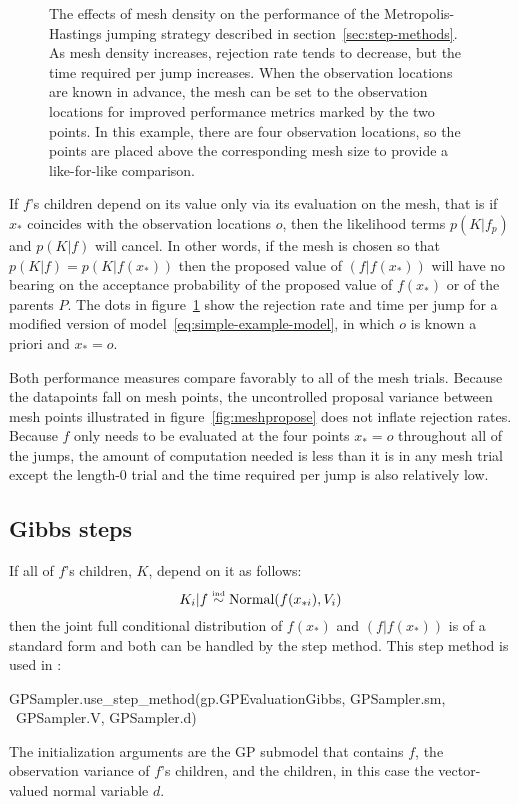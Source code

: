 \documentclass[article]{jss}
\begin{document}
\begin{figure}
    \centering
    \caption{The effects of mesh density on the performance of the Metropolis-Hastings jumping strategy described in section~\ref{sec:step-methods}. As mesh density increases, rejection rate tends to decrease, but the time required per jump increases. When the observation locations are known in advance, the mesh can be set to the observation locations for improved performance metrics marked by the two points. In this example, there are four observation locations, so the points are placed above the corresponding mesh size to provide a like-for-like comparison.}
    \label{fig:meshchoice}
\end{figure}

If $f$'s children depend on its value only via its evaluation on the mesh, that is if $x_*$ coincides with the observation locations $o$, then the likelihood terms $p(K|f_p)$ and $p(K|f)$ will cancel. In other words, if the mesh is chosen so that $p(K|f)=p(K|f(x_*))$ then the proposed value of $(f|f(x_*))$ will have no bearing on the acceptance probability of the proposed value of $f(x_*)$ or of the parents $P$. The dots in figure~\ref{fig:meshchoice} show the rejection rate and time per jump for a modified version of model~\ref{eq:simple-example-model}, in which $o$ is known a priori and $x_*=o$. 

Both performance measures compare favorably to all of the mesh trials. Because the datapoints fall on mesh points, the uncontrolled proposal variance between mesh points illustrated in figure~\ref{fig:meshpropose} does not inflate rejection rates. Because $f$ only needs to be evaluated at the four points $x_*=o$ throughout all of the jumps, the amount of computation needed is less than it is in any mesh trial except the length-0 trial and the time required per jump is also relatively low.

\subsection{Gibbs steps} 
\label{sec:gp-gibbs} 
If all of $f$'s children, $K$, depend on it as follows:
\begin{equation}
    \label{eq:gibbs-criterion} 
    K_i|f \stackrel{\textup{\tiny ind}}{\sim} \textup{Normal}(f(x_{*i}),V_i)
\end{equation}
then the joint full conditional distribution of $f(x_*)$ and $(f|f(x_*))$ is of a standard form and both can be handled by the  step method. This step method is used in :
\begin{CodeChunk}
\begin{CodeInput}
GPSampler.use_step_method(gp.GPEvaluationGibbs, GPSampler.sm, \
    GPSampler.V, GPSampler.d)
\end{CodeInput}
\end{CodeChunk}
The initialization arguments are the GP submodel that contains $f$, the observation variance of $f$'s children, and the children, in this case the vector-valued normal variable $d$. 
\end{document}
